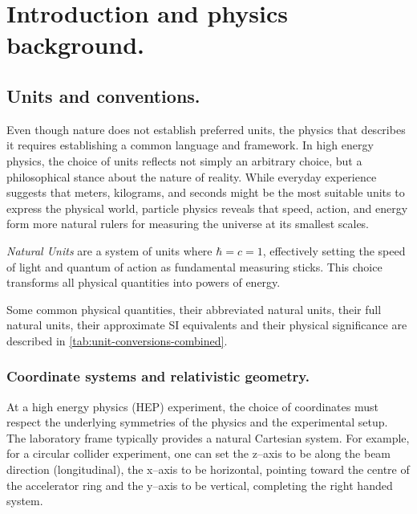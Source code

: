 \chapter{Introduction and physics background.}
\label{chap:introduction}
\chapterminitoc

\section{Units and conventions.}
\label{sec:units_and_conventions}
\sectionminitoc
    Even though nature does not establish preferred units, the physics that describes it requires establishing a common language and framework.
    In high energy physics, the choice of units reflects not simply an arbitrary choice, but a philosophical stance about the nature of reality.
    While everyday experience suggests that meters, kilograms, and seconds might be the most suitable units to express the physical world, particle physics reveals that speed, action, and energy form more natural rulers for measuring the universe at its smallest scales.
    \begin{definition}
        \emph{Natural Units} are a system of units where \(\hbar = c = 1\), effectively setting the speed of light and quantum of action as fundamental measuring sticks.
        This choice transforms all physical quantities into powers of energy.
    \end{definition}
    

    Some common physical quantities, their abbreviated natural units, their full natural units, their approximate SI equivalents and their physical significance are described in \cref{tab:unit-conversions-combined}.
    
\subsection{Coordinate systems and relativistic geometry.}
    At a high energy physics (HEP) experiment, the choice of coordinates must respect the underlying symmetries of the physics and the experimental setup.
    The laboratory frame typically provides a natural Cartesian system.
    For example, for a circular collider experiment, one can set the  z--axis to be along the beam direction (longitudinal), the x--axis to be horizontal, pointing toward the centre of the accelerator ring and the y--axis to be vertical, completing the right handed system.

